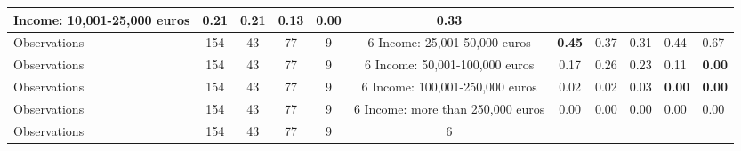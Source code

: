 \begin{tabular}{l c c c c c c }
Income: 10,001-25,000 euros &      0.21 &      0.21 &      0.13 & \textbf{     0.00} &      0.33 \\
\midrule
Observations &       154 &        43 &        77 &         9 &         6
Income: 25,001-50,000 euros & \textbf{     0.45} &      0.37 &      0.31 &      0.44 &      0.67 \\
\midrule
Observations &       154 &        43 &        77 &         9 &         6
Income: 50,001-100,000 euros &      0.17 &      0.26 &      0.23 &      0.11 & \textbf{     0.00} \\
\midrule
Observations &       154 &        43 &        77 &         9 &         6
Income: 100,001-250,000 euros &      0.02 &      0.02 &      0.03 & \textbf{     0.00} & \textbf{     0.00} \\
\midrule
Observations &       154 &        43 &        77 &         9 &         6
Income: more than 250,000 euros &      0.00 &      0.00 &      0.00 &      0.00 &      0.00 \\
\midrule
Observations &       154 &        43 &        77 &         9 &         6
\bottomrule
\end{tabular}
